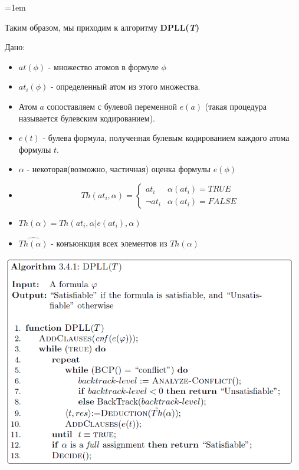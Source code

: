 \documentclass[12pt]{extreport}
\theoremstyle{definiton}
\theoremstyle{definition}
\theoremstyle{definition}
\newenvironment{blockquote}{%
  \par%
  \medskip
  \leftskip=1em%
  \noindent}{%
  \par\medskip}
\begin{document}
\begin{blockquote}
{Таким образом, мы приходим к алгоритму \textbf{DPLL(\textit{T})} \\ 
\par
Дано:
\begin{itemize}
    \item $at(\phi)$ - множество атомов в формуле $\phi$
    \item $at_i(\phi)$ - определенный атом из этого множества.
    \item Атом $a$ сопоставляем с булевой переменной $e(a)$ (такая процедура называется булевским кодированием).
    \item $e(t)$ - булева формула, полученная булевым кодированием каждого атома формулы $t$.
    \item $\alpha$ - некоторая(возможно, частичная) оценка формулы $e(\phi)$
    \item 
    \begin{equation*}
        Th(at_i, \alpha) =
        \begin{cases}
          at_i & \alpha(at_i) = TRUE \\
          \neg at_i & \alpha(at_i) = FALSE
        \end{cases}
    \end{equation*}
    \item $Th(\alpha) = {Th(at_i, \alpha | e(at_i), \alpha)}$
    \item $\hat{Th(\alpha)}$ - конъюнкция всех элементов из $Th(\alpha)$
\end{itemize}
\begin{center}
  \includegraphics[width=13cm]{images/DPLL.png}  
\end{center}

}
\end{blockquote}
\end{document}
